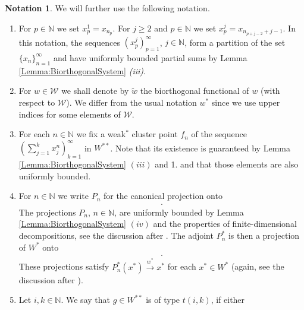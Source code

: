 \documentclass{amsart}
\theoremstyle{definition}
\newtheorem{notation}[theorem]{Notation}
\begin{document}
\begin{notation} \label{Notation} We will further use the following notation.

    \begin{enumerate}[1.]
        \item For $p \in \mathbb{N}$ we set $x^1_p = x_{n_p}$. For $j \geq 2$ and $p \in \mathbb{N}$ we set $x^j_p = x_{n_{p+j-2} + j-1}$. In this notation, the sequences $(x^j_p)_{p=1}^\infty$, $j \in \mathbb{N}$, form a partition of the set $\{x_n\}_{n=1}^\infty$ and have uniformly bounded partial sums by Lemma \ref{Lemma:BiorthogonalSystem} \textit{(iii)}.
        \item For $w \in \mathcal{W}$ we shall denote by $\widetilde{w}$ the biorthogonal functional of $w$ (with respect to $\mathcal{W}$). We differ from the usual notation $w^*$ since we use upper indices for some elements of $\mathcal{W}$.
        \item For each $n \in \mathbb{N}$ we fix a weak$^*$ cluster point $f_n$ of the sequence $\left( \sum_{j=1}^k x_j^n \right)_{k=1}^\infty$ in $W^{**}$. Note that its existence is guaranteed by Lemma \ref{Lemma:BiorthogonalSystem} $(iii)$ and 1. and that those elements are also uniformly bounded.
        \item For $n \in \mathbb{N}$ we write $P_n$ for the canonical projection onto
            \begin{align*}
                [x_1,x_2,u_1,x_3,x_4,x_5,u_2,\dots,x_{n_n},x_{n_n+1}\dots,x_{n_n+n},u_n].
            \end{align*}
            The projections $P_n$, $n \in \mathbb{N}$, are uniformly bounded by Lemma \ref{Lemma:BiorthogonalSystem} $(iv)$ and the properties of finite-dimensional decompositions, see the discussion after \cite[Definition 1.g.1.]{LindenstraussTzafririClassicalBSI}. The adjoint $P_n^*$ is then a projection of $W^*$ onto
            \begin{align*}
                [\widetilde{x}_1,\widetilde{x}_2,\widetilde{u}_1,\widetilde{x}_3,\widetilde{x}_4,\widetilde{x}_5,\widetilde{u}_2,\dots,\widetilde{x}_{n_n},\widetilde{x}_{n_n+1}\dots,\widetilde{x}_{n_n+n},\widetilde{u}_n].
            \end{align*}
            These projections satisfy $P_n^*(x^*) \overset{w^*}{\longrightarrow} x^*$ for each $x^* \in W^*$ (again, see the discussion after \cite[Definition 1.g.1.]{LindenstraussTzafririClassicalBSI}).
        \item Let $i,k \in \mathbb{N}$. We say that $g \in W^{**}$ is of type $t(i,k)$, if either

\end{enumerate}
\end{notation}
\end{document}
